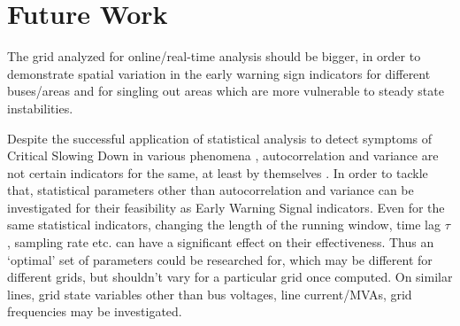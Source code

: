 \section[Future Work]{Future Work}
\label{sec:future}

The grid analyzed for online/real-time analysis should be bigger, in order to demonstrate spatial variation in the early warning sign indicators for different buses/areas and for singling out areas which are more vulnerable to steady state instabilities.

Despite the successful application of statistical analysis to detect symptoms of Critical Slowing Down in various phenomena \cite{schefferEarlyWarningSignalsForCriticalTransitions}, autocorrelation and variance are not certain indicators for the same, at least by themselves \cite{csdNotDetectedByAutocorrAndVariance01}.
In order to tackle that, statistical parameters other than autocorrelation and variance can be investigated for their feasibility as Early Warning Signal indicators. Even for the same statistical indicators, changing the length of the running window, time lag $\tau$, sampling rate etc. can have a significant effect on their effectiveness. Thus an `optimal' set of parameters could be researched for, which may be different for different grids, but shouldn't vary for a particular grid once computed.
On similar lines, grid state variables other than bus voltages, line current/MVAs, grid frequencies may be investigated.